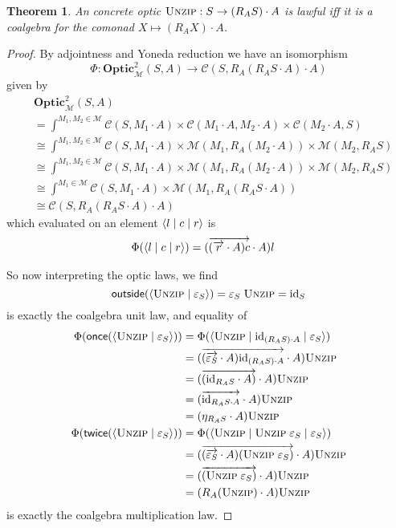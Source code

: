 \documentclass[11pt,letterpaper]{article}
\theoremstyle{plain}
\newtheorem{theorem}{Theorem}[subsection]
\theoremstyle{definition}
\newcommand{\C}{\mathscr{C}}
\newcommand{\M}{\mathscr{M}}
\newcommand{\Twoptic}{\mathbf{Optic}^2}
\newcommand{\id}{\mathrm{id}}
\newcommand{\act}{\cdot}
\newcommand{\rep}[2]{{\ensuremath \left\langle #1 \mid #2 \right\rangle}}
\newcommand{\repthree}[3]{{\ensuremath \langle #1 \mid #2 \mid #3 \rangle}}
\newcommand{\funzip}{\textsc{Unzip}}
\newcommand{\outside}{\mathsf{outside}}
\newcommand{\once}{\mathsf{once}}
\newcommand{\twice}{\mathsf{twice}}
\begin{document}
\begin{theorem}\label{thm:optics-are-coalgebras}
An concrete optic $\funzip : S \to  (R_{A} S) \act A$ is lawful iff it is a coalgebra for the comonad $X \mapsto (R_{A} X) \act A$.
\end{theorem}
\begin{proof}
By adjointness and Yoneda reduction we have an isomorphism \[\Phi : \Twoptic_\M(S, A) \to \C(S, R_A (R_A S \act A) \act A)\] given by
\begin{align*}
&\Twoptic_\M(S, A) \\
&= \int^{M_1, M_2 \in \M} \C(S, M_1 \act A) \times \C(M_1 \act A, M_2 \act A) \times \C(M_2 \act A, S) \\
&\cong \int^{M_1, M_2 \in \M} \C(S, M_1 \act A) \times \M(M_1, R_A (M_2 \act A)) \times \M(M_2, R_A S) \\
&\cong \int^{M_1, M_2 \in \M} \C(S, M_1 \act A) \times \M(M_1, R_A (M_2 \act A)) \times \M(M_2, R_A S) \\
&\cong \int^{M_1 \in \M} \C(S, M_1 \act A) \times \M(M_1, R_A (R_A S \act A)) \\
&\cong \C(S, R_A (R_A S \act A) \act A)
\end{align*}
  which evaluated on an element $\repthree{l}{c}{r}$ is
  \begin{align*}
    \Phi(\repthree{l}{c}{r}) &= (\overrightarrow{(\overrightarrow{r} \act A)c} \act A)l
  \end{align*}

So now interpreting the optic laws, we find
\[\outside(\rep{\funzip}{\varepsilon_{S} }) = \varepsilon_{S} \; \funzip = \id_S \] is exactly the coalgebra unit law, and equality of
  \begin{align*}
    \Phi(\once(\rep{\funzip}{\varepsilon_S}))
    &= \Phi(\repthree{\funzip}{\id_{(R_{A} S) \act A}}{\varepsilon_S }) \\
    &= (\overrightarrow{(\overrightarrow{\varepsilon_S} \act A)\id_{(R_{A} S) \act A}} \act A)\funzip \\
    &= (\overrightarrow{(\id_{R_A S} \act A)} \act A)\funzip \\
    &= (\overrightarrow{\id_{R_A S \act A}} \act A)\funzip \\
    &= (\eta_{R_A S} \act A) \funzip \\
    \Phi(\twice(\rep{\funzip}{\varepsilon_S }))
    &= \Phi(\repthree{\funzip}{\funzip \; \varepsilon_S}{\varepsilon_S }) \\
    &= (\overrightarrow{(\overrightarrow{\varepsilon_S} \act A)(\funzip \; \varepsilon_S)} \act A)\funzip \\
    &= (\overrightarrow{(\funzip \; \varepsilon_S)} \act A)\funzip \\
    &= (R_A (\funzip) \act A)\funzip
  \end{align*}
is exactly the coalgebra multiplication law.
\end{proof}
\end{document}
